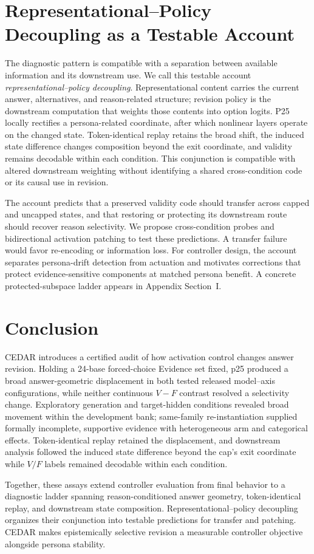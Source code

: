 \documentclass[letterpaper]{article} %
\begin{document}
\section{Representational--Policy Decoupling as a Testable Account}
\label{sec:implications}

The diagnostic pattern is compatible with a separation between available information and its downstream use. We call this testable account \emph{representational--policy decoupling}. Representational content carries the current answer, alternatives, and reason-related structure; revision policy is the downstream computation that weights those contents into option logits. P25 locally rectifies a persona-related coordinate, after which nonlinear layers operate on the changed state. Token-identical replay retains the broad shift, the induced state difference changes composition beyond the exit coordinate, and validity remains decodable within each condition. This conjunction is compatible with altered downstream weighting without identifying a shared cross-condition code or its causal use in revision.

The account predicts that a preserved validity code should transfer across capped and uncapped states, and that restoring or protecting its downstream route should recover reason selectivity. We propose cross-condition probes and bidirectional activation patching to test these predictions. A transfer failure would favor re-encoding or information loss. For controller design, the account separates persona-drift detection from actuation and motivates corrections that protect evidence-sensitive components at matched persona benefit. A concrete protected-subspace ladder appears in Appendix Section~I.

\section{Conclusion}
\label{sec:conclusion}

CEDAR introduces a certified audit of how activation control changes answer revision. Holding a 24-base forced-choice Evidence set fixed, p25 produced a broad answer-geometric displacement in both tested released model--axis configurations, while neither continuous $V-F$ contrast resolved a selectivity change. Exploratory generation and target-hidden conditions revealed broad movement within the development bank; same-family re-instantiation supplied formally incomplete, supportive evidence with heterogeneous arm and categorical effects. Token-identical replay retained the displacement, and downstream analysis followed the induced state difference beyond the cap's exit coordinate while $V/F$ labels remained decodable within each condition.

Together, these assays extend controller evaluation from final behavior to a diagnostic ladder spanning reason-conditioned answer geometry, token-identical replay, and downstream state composition. Representational--policy decoupling organizes their conjunction into testable predictions for transfer and patching. CEDAR makes epistemically selective revision a measurable controller objective alongside persona stability.


\end{document}
